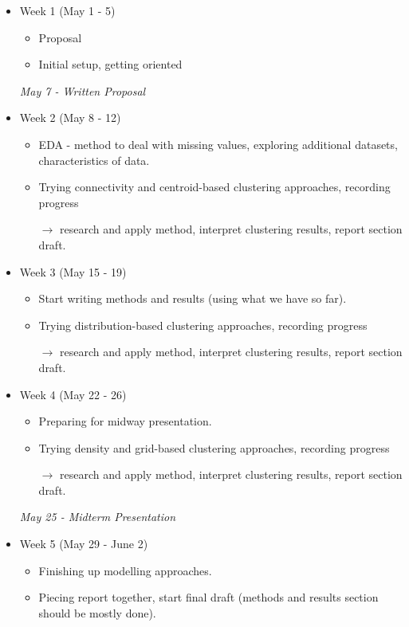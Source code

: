 \documentclass[11pt, a4paper]{article}
\begin{document}
\begin{itemize}
\item Week 1  \dotfill (May 1 - 5)
\begin{itemize}
\item Proposal
\item Initial setup, getting oriented
\end{itemize}

\textit{May 7 - Written Proposal}

\item Week 2  \dotfill (May 8 - 12)
\begin{itemize}
\item EDA - method to deal with missing values, exploring additional datasets, characteristics of data.
\item Trying connectivity and centroid-based clustering approaches, recording progress \par$\longrightarrow$ research and apply method, interpret clustering results, report section draft. 

\end{itemize}

\item Week 3  \dotfill (May 15 - 19)
\begin{itemize}
\item Start writing methods and results (using what we have so far).
\item Trying distribution-based clustering approaches, recording progress \par$\longrightarrow$ research and apply method, interpret clustering results, report section draft. 
\end{itemize}

\item Week 4  \dotfill (May 22 - 26)
\begin{itemize}
\item Preparing for midway presentation.
\item Trying density and grid-based clustering approaches, recording progress \par$\longrightarrow$ research and apply method, interpret clustering results, report section draft. 
\end{itemize}

\textit{May 25 - Midterm Presentation}

\item Week 5  \dotfill (May 29 - June 2)
\begin{itemize}
\item Finishing up modelling approaches.
\item Piecing report together, start final draft (methods and results section should be mostly done).
\end{itemize}


\end{itemize}
\end{document}
